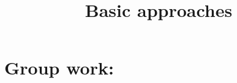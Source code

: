 \documentclass[noinstructornotes]{ximera}
\title{Basic approaches}
\begin{document}
\begin{abstract}		\end{abstract}
\maketitle

\section{Group work:}
\end{document}
